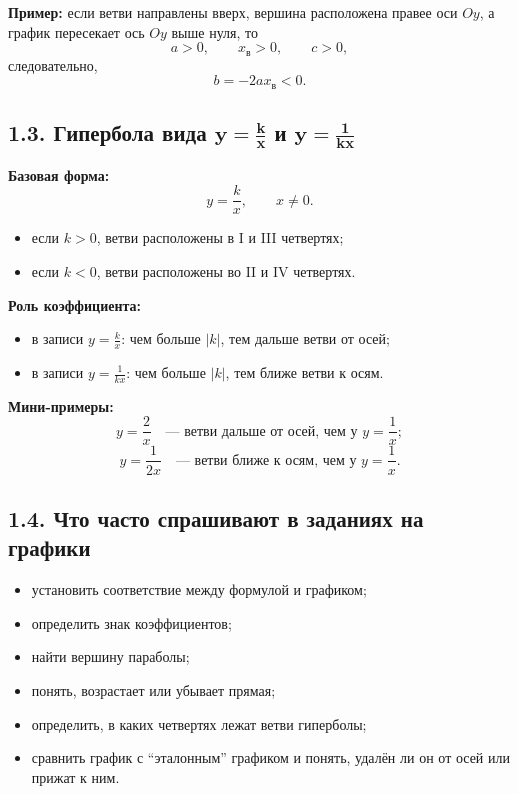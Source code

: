 \documentclass[a4paper,12pt]{article}
\begin{document}
\textbf{Пример:}
если ветви направлены вверх, вершина расположена правее оси \(Oy\), а график пересекает ось \(Oy\) выше нуля, то
\[
a>0,\qquad x_{\text{в}}>0,\qquad c>0,
\]
следовательно,
\[
b=-2ax_{\text{в}}<0.
\]

\subsection*{1.3. Гипербола вида \(\boldsymbol{y=\frac{k}{x}}\) и \(\boldsymbol{y=\frac{1}{kx}}\)}
\textbf{Базовая форма:}
\[
y=\frac{k}{x},\qquad x\neq 0.
\]

\begin{itemize}
  \item если \(k>0\), ветви расположены в I и III четвертях;
  \item если \(k<0\), ветви расположены во II и IV четвертях.
\end{itemize}

\textbf{Роль коэффициента:}
\begin{itemize}
  \item в записи \(\displaystyle y=\frac{k}{x}\): чем больше \(|k|\), тем дальше ветви от осей;
  \item в записи \(\displaystyle y=\frac{1}{kx}\): чем больше \(|k|\), тем ближе ветви к осям.
\end{itemize}

\textbf{Мини-примеры:}
\[
y=\frac{2}{x}\quad \text{--- ветви дальше от осей, чем у } y=\frac{1}{x};
\]
\[
y=\frac{1}{2x}\quad \text{--- ветви ближе к осям, чем у } y=\frac{1}{x}.
\]

\subsection*{1.4. Что часто спрашивают в заданиях на графики}
\begin{itemize}
  \item установить соответствие между формулой и графиком;
  \item определить знак коэффициентов;
  \item найти вершину параболы;
  \item понять, возрастает или убывает прямая;
  \item определить, в каких четвертях лежат ветви гиперболы;
  \item сравнить график с ``эталонным'' графиком и понять, удалён ли он от осей или прижат к ним.
\end{itemize}

\end{document}
